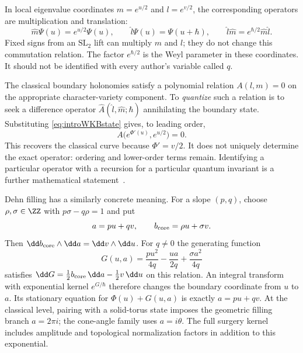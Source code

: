 In local eigenvalue coordinates $m=e^{u/2}$ and $l=e^{v/2}$,
the corresponding operators are multiplication and translation:
\[
 \widehat m\Psi(u)=e^{u/2}\Psi(u),\qquad
 \widehat l\Psi(u)=\Psi(u+\hbar),\qquad
 \widehat l\widehat m=e^{\hbar/2}\widehat m\widehat l.
\]
Fixed signs from an $\mathrm{SL}_2$ lift can multiply $m$ and $l$;
they do not change this commutation relation. The factor
$e^{\hbar/2}$ is the Weyl parameter in these coordinates. It should
not be identified with every author's variable called $q$.

The classical boundary holonomies satisfy a polynomial relation
$A(l,m)=0$ on the appropriate character-variety component. To
\emph{quantize} such a relation is to seek a difference operator
$\widehat A(\widehat l,\widehat m;\hbar)$ annihilating the boundary
state. Substituting \eqref{eq:introWKBstate} gives, to leading order,
\[
 A\bigl(e^{\Phi'(u)},e^{u/2}\bigr)=0.
\]
This recovers the classical curve because $\Phi'=v/2$. It does not
uniquely determine the exact operator: ordering and lower-order
terms remain. Identifying a particular operator with a recursion
for a particular quantum invariant is a further mathematical
statement~\cite{GukovApoly,DimofteQuantumRS}.

Dehn filling has a similarly concrete meaning. For a slope $(p,q)$,
choose $\rho,\sigma\in\ZZ$ with $p\sigma-q\rho=1$ and put
\[
 a=pu+qv,\qquad b_{\rm core}=\rho u+\sigma v.
\]
Then $\dd b_{\rm core}\wedge\dd a=\dd v\wedge\dd u$. For $q\ne0$
the generating function
\begin{equation}
 G(u,a)=\frac{pu^2}{4q}-\frac{ua}{2q}
                    +\frac{\sigma a^2}{4q}
 \label{eq:introfillingkernel}
\end{equation}
satisfies $\dd G=\frac12b_{\rm core}\,\dd a-\frac12v\,\dd u$ on
this relation. An integral transform with exponential kernel
$e^{G/\hbar}$ therefore changes the boundary coordinate from $u$
to $a$. Its stationary equation for $\Phi(u)+G(u,a)$ is exactly
$a=pu+qv$. At the classical level, pairing with a solid-torus state imposes
the geometric filling branch $a=2\pi i$; the cone-angle family
uses $a=i\theta$.
The full surgery kernel includes amplitude and topological
normalization factors in addition to this exponential.

